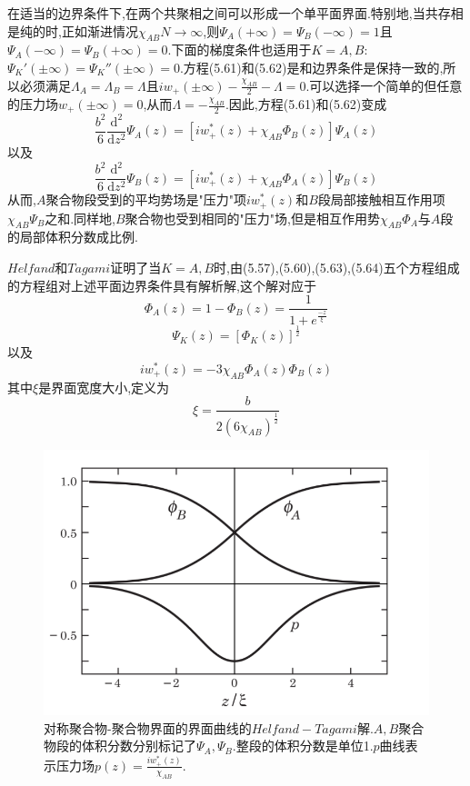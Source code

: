 在适当的边界条件下,在两个共聚相之间可以形成一个单平面界面.特别地,当共存相是纯的时,正如渐进情况$\chi_{AB}N\rightarrow\infty$,则$\Psi_{A}(+\infty)=\Psi_{B}(-\infty)=1$且$\Psi_{A}(-\infty)=\Psi_{B}(+\infty)=0$.下面的梯度条件也适用于$K=A,B$:$\Psi_K'(\pm\infty)=\Psi_K''(\pm\infty)=0$.方程(5.61)和(5.62)是和边界条件是保持一致的,所以必须满足$\Lambda_A=\Lambda_B=\Lambda$且$iw_+(\pm \infty)-\frac{\chi_{AB}}{2}-\Lambda=0$.可以选择一个简单的但任意的压力场$w_+(\pm\infty)=0$,从而$\Lambda=-\frac{\chi_{AB}}{2}$.因此,方程(5.61)和(5.62)变成
\begin{equation}
\frac{b^{2}}{6}\frac{\mathrm{d}^{2}}{\mathrm{d} z^{2}} \Psi_{A}(z)=[iw_+^*(z)+\chi_{AB}\Phi_{B}(z)]\Psi_{A}(z)
\end{equation}
以及
\begin{equation}
\frac{b^{2}}{6}\frac{\mathrm{d}^{2}}{\mathrm{d} z^{2}} \Psi_{B}(z)=[iw_+^*(z)+\chi_{AB}\Phi_{A}(z)]\Psi_{B}(z)
\end{equation}
从而,$A$聚合物段受到的平均势场是"压力"项$iw_+^*(z)$和$B$段局部接触相互作用项$\chi_{AB}\Psi_{B}$之和.同样地,$B$聚合物也受到相同的"压力"场,但是相互作用势$\chi_{AB}\Phi_{A}$与$A$段的局部体积分数成比例.

$Helfand$和$Tagami$证明了当$K=A,B$时,由(5.57),(5.60),(5.63),(5.64)五个方程组成的方程组对上述平面边界条件具有解析解,这个解对应于
\begin{equation}
\Phi_{A}(z)=1-\Phi_{B}(z)=\frac{1}{1+e^{\frac{-z}{\xi}}}
\end{equation}
\begin{equation}
\Psi_K(z) = [\Phi_K(z)]^{\frac{1}{2}}
\end{equation}
以及
\begin{equation}
iw_+^*(z)=-3\chi_{AB}\Phi_{A}(z)\Phi_{B}(z)
\end{equation}
其中$\xi$是界面宽度大小,定义为
\begin{equation}
\xi = \frac{b}{2(6\chi_{AB})^{\frac{1}{2}}}
\end{equation}
\begin{figure}[H]
	\centering
	\includegraphics[width=12cm]{./figures/fig5-4.png}
	\caption{对称聚合物-聚合物界面的界面曲线的$Helfand−Tagami$解.$A,B$聚合物段的体积分数分别标记了$\Psi_{A},\Psi_{B}$.整段的体积分数是单位1.$p$曲线表示压力场$p(z)=\frac{iw_+^*(z)}{\chi_{AB}}$.}
\end{figure}

